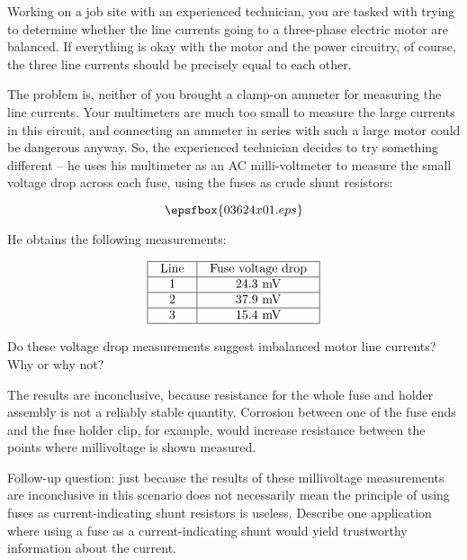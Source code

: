 

Working on a job site with an experienced technician, you are tasked with trying to determine whether the line currents going to a three-phase electric motor are balanced.  If everything is okay with the motor and the power circuitry, of course, the three line currents should be precisely equal to each other.

The problem is, neither of you brought a clamp-on ammeter for measuring the line currents.  Your multimeters are much too small to measure the large currents in this circuit, and connecting an ammeter in series with such a large motor could be dangerous anyway.  So, the experienced technician decides to try something different -- he uses his multimeter as an AC milli-voltmeter to measure the small voltage drop across each fuse, using the fuses as crude shunt resistors:

$$\epsfbox{03624x01.eps}$$

He obtains the following measurements:


$$\vbox{\offinterlineskip
\halign{\strut
\vrule \quad\hfil # \ \hfil & 
\vrule \quad\hfil # \ \hfil \vrule \cr
\noalign{\hrule}
%
Line & Fuse voltage drop \cr
%
\noalign{\hrule}
%
1 & 24.3 mV \cr
%
\noalign{\hrule}
%
2 & 37.9 mV \cr
%
\noalign{\hrule}
%
3 & 15.4 mV \cr
%
\noalign{\hrule}
} %
}$$ %

Do these voltage drop measurements suggest imbalanced motor line currents?  Why or why not?







The results are inconclusive, because resistance for the whole fuse and holder assembly is not a reliably stable quantity.  Corrosion between one of the fuse ends and the fuse holder clip, for example, would increase resistance between the points where millivoltage is shown measured.

\vskip 10pt

Follow-up question: just because the results of these millivoltage measurements are inconclusive in this scenario does not necessarily mean the principle of using fuses as current-indicating shunt resistors is useless.  Describe one application where using a fuse as a current-indicating shunt would yield trustworthy information about the current.

